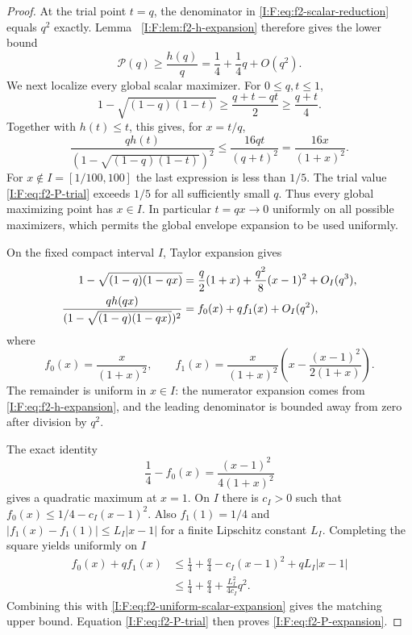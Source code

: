 \begin{proof}
At the trial point $t=q$, the denominator in
\eqref{I:F:eq:f2-scalar-reduction} equals $q^2$ exactly.  Lemma~
\ref{I:F:lem:f2-h-expansion} therefore gives the lower bound
\begin{equation}
 \mathcal P(q)\ge\frac{h(q)}q
              =\frac14+\frac14q+O(q^2).
 \label{I:F:eq:f2-P-trial}
\end{equation}
We next localize every global scalar maximizer.  For $0\le q,t\le1$,
\[
 1-\sqrt{(1-q)(1-t)}
 \ge\frac{q+t-qt}{2}\ge\frac{q+t}{4}.
\]
Together with $h(t)\le t$, this gives, for $x=t/q$,
\begin{equation}
 \frac{q h(t)}{(1-\sqrt{(1-q)(1-t)})^2}
 \le\frac{16qt}{(q+t)^2}
 =\frac{16x}{(1+x)^2}.
 \label{I:F:eq:f2-scalar-coarse-localization}
\end{equation}
For $x\notin I=[1/100,100]$ the last expression is less than $1/5$.
The trial value \eqref{I:F:eq:f2-P-trial} exceeds $1/5$ for all sufficiently
small $q$.  Thus every global maximizing point has $x\in I$.
In particular $t=qx\to0$ uniformly on all possible maximizers, which
permits the global envelope expansion to be used uniformly.

On the fixed compact interval $I$, Taylor expansion gives
\begin{align}
 1-\sqrt{(1-q)(1-qx)}
 &=\frac q2(1+x)+\frac{q^2}{8}(x-1)^2+O_I(q^3),\notag\\
 \frac{q h(qx)}{(1-\sqrt{(1-q)(1-qx)})^2}
 &=f_0(x)+qf_1(x)+O_I(q^2),
 \label{I:F:eq:f2-uniform-scalar-expansion}
\end{align}
where
\begin{equation}
 f_0(x)=\frac{x}{(1+x)^2},\qquad
 f_1(x)=\frac{x}{(1+x)^2}
       \left(x-\frac{(x-1)^2}{2(1+x)}\right).
 \label{I:F:eq:f2-f0-f1}
\end{equation}
The remainder is uniform in $x\in I$: the numerator expansion comes
from \eqref{I:F:eq:f2-h-expansion}, and the leading denominator is bounded
away from zero after division by $q^2$.

The exact identity
\[
 \frac14-f_0(x)=\frac{(x-1)^2}{4(1+x)^2}
\]
gives a quadratic maximum at $x=1$.  On $I$ there is $c_I>0$ such that
$f_0(x)\le1/4-c_I(x-1)^2$.  Also $f_1(1)=1/4$ and
$|f_1(x)-f_1(1)|\le L_I|x-1|$ for a finite Lipschitz constant $L_I$.
Completing the square yields uniformly on $I$
\begin{align*}
 f_0(x)+qf_1(x)
 &\le\frac14+\frac q4-c_I(x-1)^2+qL_I|x-1|\\
 &\le\frac14+\frac q4+\frac{L_I^2}{4c_I}q^2.
\end{align*}
Combining this with \eqref{I:F:eq:f2-uniform-scalar-expansion} gives the
matching upper bound.  Equation \eqref{I:F:eq:f2-P-trial} then proves
\eqref{I:F:eq:f2-P-expansion}.
\end{proof}
